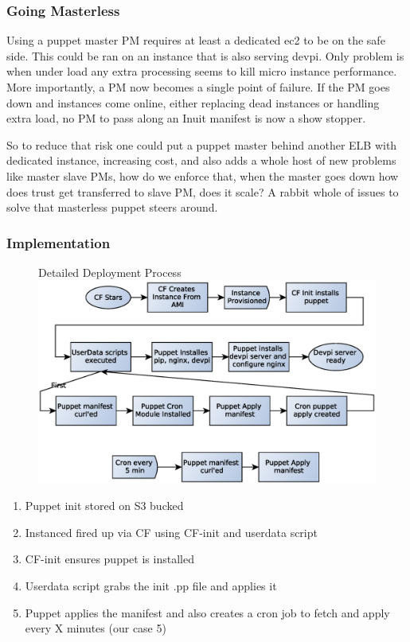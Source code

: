 \documentclass[12pt, letterpaper]{article}
\begin{document}
\subsubsection{Going Masterless}

Using a puppet master PM requires at least a dedicated ec2 to be on the safe side. This could be ran on an instance
that is also serving devpi. Only problem is when under load any extra processing seems to kill micro instance performance.
More importantly, a PM now becomes a single point of failure. If the PM goes down and instances
come online, either replacing dead instances or handling extra load, no PM to pass along an Inuit manifest is now a show stopper.

So to reduce that risk one could put a puppet master behind another ELB with dedicated instance, increasing cost, and also adds 
a whole host of new problems like master slave PMs, how do we enforce that, when the master goes down how does trust get 
transferred to slave PM, does it scale? A rabbit whole of issues to solve that masterless puppet steers around.

\subsubsection{Implementation}

\begin{figure}[h]
    \centering
    Detailed Deployment Process 
    \includegraphics[width=\textwidth]{figures/base_setup.eps}
\end{figure}
\begin{enumerate}
    \item Puppet init stored on S3 bucked
    \item Instanced fired up via CF using CF-init and userdata script
    \item CF-init ensures puppet is installed
    \item Userdata script grabs the init .pp file and applies it
    \item Puppet applies the manifest and also creates a cron job to fetch and apply every X minutes (our case 5) 
\end{enumerate}
\end{document}
